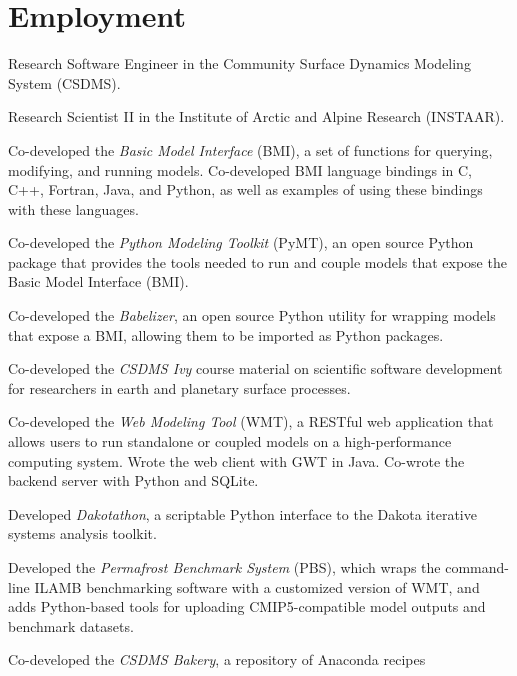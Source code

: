\section{Employment}
\vspace{0.5em}

\begin{compactitem}[\itembullet]
  \item
    Research Software Engineer in the Community
    Surface Dynamics Modeling System (CSDMS).
    \item
    Research Scientist II in 
    the Institute of Arctic and Alpine Research (INSTAAR).
  \item
    Co-developed the \textit{Basic Model Interface} (BMI), a set of functions
    for querying, modifying, and running models. Co-developed BMI language
    bindings in C, C++, Fortran, Java, and Python, as well as examples of using
    these bindings with these languages.
  \item
    Co-developed the \textit{Python Modeling Toolkit} (PyMT), an
    open source Python package that provides the tools needed to run
    and couple models that expose the Basic Model Interface (BMI).
  \item
    Co-developed the \textit{Babelizer}, an open source Python utility for
    wrapping models that expose a BMI, allowing them to be imported as Python
    packages.
  \item 
    Co-developed the \textit{CSDMS Ivy} course material on scientific software
    development for researchers in earth and planetary surface processes.
  \item
    Co-developed the \textit{Web Modeling Tool} (WMT), a RESTful
    web application that allows users to run standalone or coupled
    models on a high-performance computing system. Wrote the web
    client with GWT in Java. Co-wrote the backend server with Python
    and SQLite.
  \item
    Developed \textit{Dakotathon}, a scriptable Python interface to
    the Dakota iterative systems analysis toolkit.
  \item    
    Developed the \textit{Permafrost Benchmark System} (PBS), which
    wraps the command-line ILAMB benchmarking software with a
    customized version of WMT, and adds Python-based tools for
    uploading CMIP5-compatible model outputs and benchmark datasets.
  \item
    Co-developed the \textit{CSDMS Bakery}, a repository of Anaconda recipes

\end{compactitem}
